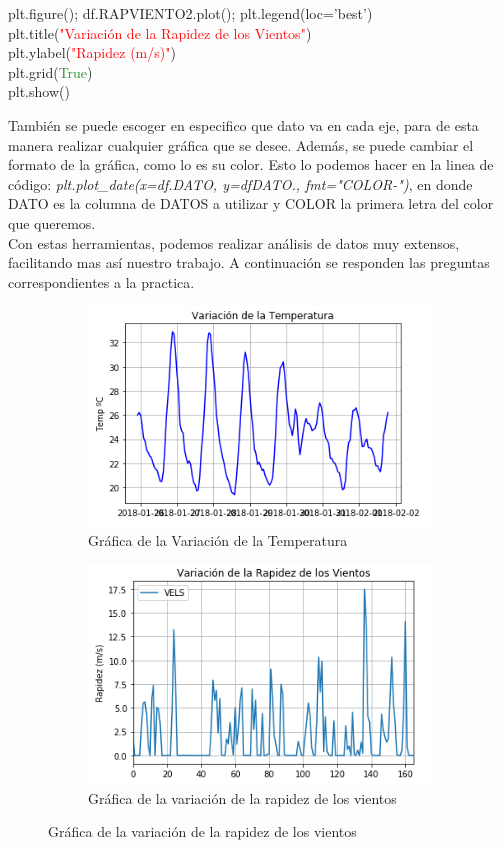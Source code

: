 \documentclass[12pt]{article}
\begin{document}
\begin{center}
plt.figure(); df.RAPVIENTO2.plot(); plt.legend(loc='best') \\
plt.title(\textcolor{red}{"Variación de la Rapidez de los Vientos"})\\
plt.ylabel(\textcolor{red}{"Rapidez (m/s)"})\\
plt.grid(\textcolor{ForestGreen}{True})\\
plt.show()\\
\end{center}

También se puede escoger en especifico que dato va en cada eje, para de esta manera realizar cualquier gráfica que se desee. Además, se puede cambiar el formato de la gráfica, como lo es su color. Esto lo podemos hacer en la linea de código: \textit{plt.plot\_date(x=df.DATO, y=dfDATO., fmt="COLOR-")}, en donde DATO es la columna de DATOS a utilizar y COLOR la primera letra del color que queremos. \\

Con estas herramientas, podemos realizar análisis de datos muy extensos, facilitando mas así nuestro trabajo. A continuación se responden las preguntas correspondientes a la practica.

\begin{figure}[h!]
\begin{subfigure}{.5\textwidth}
  \centering
  \includegraphics[width=.8\linewidth]{EjGraf1.png}
  \caption{Gráfica de la Variación de la Temperatura}
  \label{fig:sfig1}
\end{subfigure}%
\begin{subfigure}{.5\textwidth}
  \centering
  \includegraphics[width=.8\linewidth]{EjGraf3.png}
  \caption{Gráfica de la variación de la rapidez de los vientos}
  \label{fig:sfig2}
\end{subfigure}
\end{figure}
\end{document}
